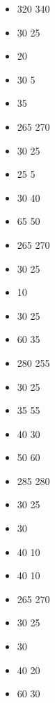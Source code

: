 \begin{multicols}{2}
\begin{itemize}
		\subsubtitle{\beastgiant}
		\item \basecost{} 320 \costup{} 340
		\item \bigbrother{} 30 \costdown{} 25
		\item \towershield{} 20 \costdown{} \free
		\item \giantclub{} 30 \costdown{} 5
		\item \infernallash{} 35 \costdown{} \free
		\subsubtitle{\feudalgiant}
		\item \basecost{} 265 \costup{} 270
		\item \bigbrother{} 30 \costdown{} 25
		\item \serfhelper{} 25 \costdown{} 5
		\item \giantclub{} 30 \costup{} 40	
		\item \knightedgiant{} 65 \costdown{} 50
		\subsubtitle{\slavegiant}
		\item \basecost{} 265 \costup{} 270
		\item \bigbrother{} 30 \costdown{} 25
		\item \ironfist{} 10 \costdown{} \free
		\item \giantclub{} 30 \costdown{} 25
		\item \trollstewcauldron{} 60 \costdown{} 35
		\subsubtitle{\giant}
		\item \basecost{} 280 \costdown{} 255
		\item \bigbrother{} 30 \costdown{} 25
		\item \giantclub{} 35 \costup{} 55
		\item \bellyflop{} 40 \costdown{} 30
		\item \nets{} 50 \costup{} 60
		\subsubtitle{\sauriangiant}
		\item \basecost{} 285 \costdown{} 280
		\item \bigbrother{} 30 \costdown{} 25
		\item \giantclub{} 30 \costdown{} \free
		\item \petsalamander{} 40 \costdown{} 10
		\item \skinkcompanion{} 40 \costdown{} 10
		\subsubtitle{\sylvangiant}
		\item \basecost{} 265 \costup{} 270
		\item \bigbrother{} 30 \costdown{} 25
		\item \giantclub{} 30 \costdown{} \free
		\item \giantsentinel{} 40 \costdown{} 20
		\item \bonebreakdancer{} 60 \costdown{} 30
		\subsubtitle{\ancientgiant}

\end{itemize}
\end{multicols}

